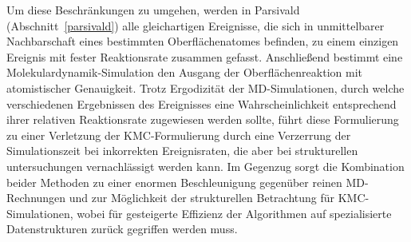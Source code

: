 Um diese Beschränkungen zu umgehen, werden in Parsivald (Abschnitt~\ref{parsivald}) alle gleichartigen Ereignisse, die sich in unmittelbarer Nachbarschaft eines bestimmten Oberflächenatomes befinden, zu einem einzigen Ereignis mit fester Reaktionsrate zusammen gefasst.
Anschließend bestimmt eine Molekulardynamik-Simulation den Ausgang der Oberflächenreaktion mit atomistischer Genauigkeit.
Trotz Ergodizität der MD-Simulationen, durch welche verschiedenen Ergebnissen des Ereignisses eine Wahrscheinlichkeit entsprechend ihrer relativen Reaktionsrate zugewiesen werden sollte, führt diese Formulierung zu einer Verletzung der KMC-Formulierung durch eine Verzerrung der Simulationszeit bei inkorrekten Ereignisraten, die aber bei strukturellen untersuchungen vernachlässigt werden kann.
Im Gegenzug sorgt die Kombination beider Methoden zu einer enormen Beschleunigung gegenüber reinen MD-Rechnungen und zur Möglichkeit der strukturellen Betrachtung für KMC-Simulationen, wobei für gesteigerte Effizienz der Algorithmen auf spezialisierte Datenstrukturen zurück gegriffen werden muss.
